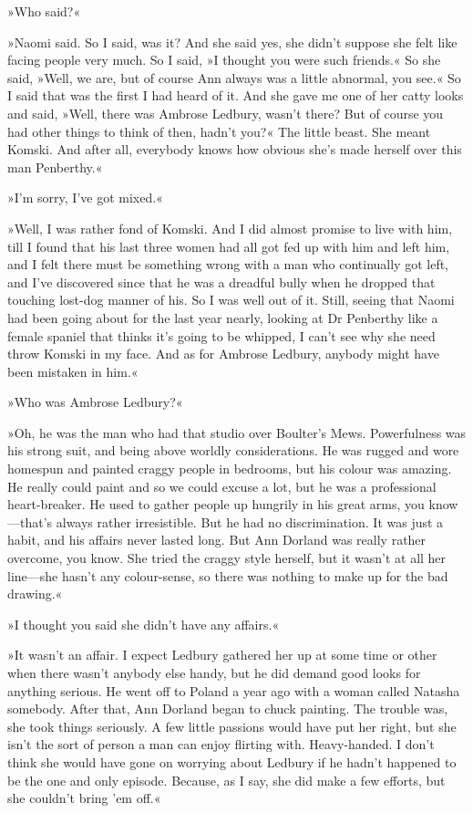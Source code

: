 »Who said?«

»Naomi said. So I said, was it? And she said yes, she didn't suppose she felt like facing people very much. So I said, »I thought you were such friends.« So she said, »Well, we are, but of course Ann always was a little abnormal, you see.« So I said that was the first I had heard of it. And she gave me one of her catty looks and said, »Well, there was Ambrose Ledbury, wasn't there? But of course you had other things to think of then, hadn't you?« The little beast. She meant Komski. And after all, everybody knows how obvious she's made herself over this man Penberthy.«

»I'm sorry, I've got mixed.«

»Well, I was rather fond of Komski. And I did almost promise to live with him, till I found that his last three women had all got fed up with him and left him, and I felt there must be something wrong with a man who continually got left, and I've discovered since that he was a dreadful bully when he dropped that touching lost-dog manner of his. So I was well out of it. Still, seeing that Naomi had been going about for the last year nearly, looking at Dr Penberthy like a female spaniel that thinks it's going to be whipped, I can't see why she need throw Komski in my face. And as for Ambrose Ledbury, anybody might have been mistaken in him.«

»Who was Ambrose Ledbury?«

»Oh, he was the man who had that studio over Boulter's Mews. Powerfulness was his strong suit, and being above worldly considerations. He was rugged and wore homespun and painted craggy people in bedrooms, but his colour was amazing. He really could paint and so we could excuse a lot, but he was a professional heart-breaker. He used to gather people up hungrily in his great arms, you know—that's always rather irresistible. But he had no discrimination. It was just a habit, and his affairs never lasted long. But Ann Dorland was really rather overcome, you know. She tried the craggy style herself, but it wasn't at all her line—she hasn't any colour-sense, so there was nothing to make up for the bad drawing.«

»I thought you said she didn't have any affairs.«

»It wasn't an affair. I expect Ledbury gathered her up at some time or other when there wasn't anybody else handy, but he did demand good looks for anything serious. He went off to Poland a year ago with a woman called Natasha somebody. After that, Ann Dorland began to chuck painting. The trouble was, she took things seriously. A few little passions would have put her right, but she isn't the sort of person a man can enjoy flirting with. Heavy-handed. I don't think she would have gone on worrying about Ledbury if he hadn't happened to be the one and only episode. Because, as I say, she did make a few efforts, but she couldn't bring 'em off.«

